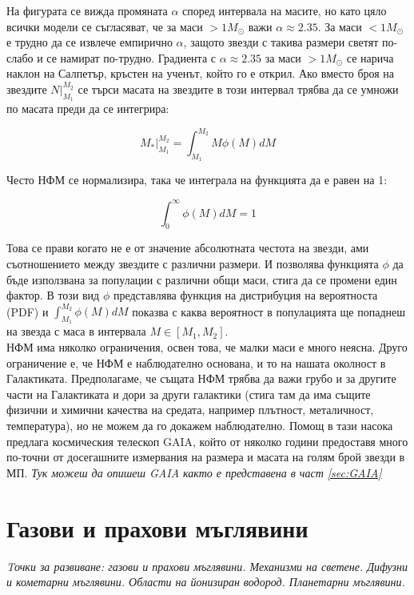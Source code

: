 \documentclass[a4paper,12pt]{article}
\begin{document}
На фигурата се вижда промяната $\alpha$ според интервала на масите, но като цяло всички модели се съгласяват, че за маси $>1 M_\odot$ важи $\alpha \approx 2.35$. За маси $<1 M_\odot$ е трудно да се извлече емпирично $\alpha$, защото звезди с такива размери светят по-слабо и се намират по-трудно. Градиента с $\alpha \approx 2.35$ за маси $>1 M_\odot$ се нарича наклон на Салпетър, кръстен на ученът, който го е открил. Ако вместо броя на звездите $N|_{M_1}^{M_2}$ се търси масата на звездите в този интервал трябва да се умножи по масата преди да се интегрира:

\begin{equation}
    M_*|_{M_1}^{M_2} = \int_{M_1}^{M_2} M\phi(M) dM
\end{equation}

Често НФМ се нормализира, така че интеграла на функцията да е равен на 1:

\begin{equation}
    \int_0^{\infty} \phi(M) dM = 1
\end{equation}

Това се прави когато не е от значение абсолютната честота на звезди, ами съотношението между звездите с различни размери. И позволява функцията $\phi$ да бъде използвана за популации с различни общи маси, стига да се промени един фактор. В този вид $\phi$ представлява функция на дистрибуция на вероятноста (PDF) и $\int_{M_1}^{M_2} \phi(M) dM$ показва с каква вероятност в популацията ще попаднеш на звезда с маса в интервала $M \in [M_1, M_2]$.\\

НФМ има няколко ограничения, освен това, че малки маси е много неясна. Друго ограничение е, че НФМ е наблюдателно основана, и то на нашата околност в Галактиката. Предполагаме, че същата НФМ трябва да важи грубо и за другите части на Галактиката и дори за други галактики (стига там да има същите физични и химични качества на средата, например плътност, металичност, температура), но не можем да го докажем наблюдателно. Помощ в тази насока предлага космическия телескоп GAIA, който от няколко години предоставя много по-точни от досегашните измервания на размера и масата на голям брой звезди в МП. \textit{Тук можеш да опишеш GAIA както е представена в част \ref{sec:GAIA}}

\section{Газови и прахови мъглявини}
\textit{Tочки за развиване: газови и прахови мъглявини. Механизми на светене. Дифузни и кометарни мъглявини. Области на йонизиран водород. Планетарни мъглявини.}\\
\end{document}
